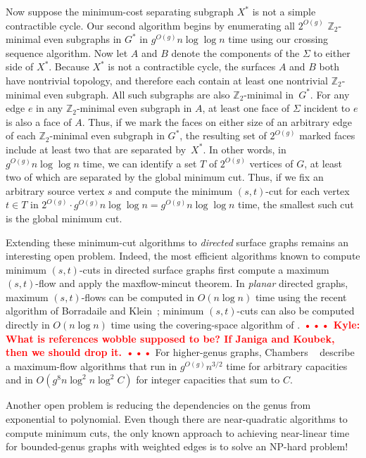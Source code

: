 \documentclass[natbib]{svcyclop}
\def\NOTE#1{\textcolor{Red}{\textbf{\textsf{••• #1 •••}}}}
\def\Z{\mathbb{Z}}
\begin{document}
Now suppose the minimum-cost separating subgraph $X^*$ is not a simple contractible cycle.  Our second algorithm begins by enumerating all $2^{O(g)}$ $\Z_2$-minimal even subgraphs in $G^*$ in $g^{O(g)}n\log\log n$ time using our crossing sequence algorithm.  Now let $A$ and $B$ denote the components of the $\Sigma$ to either side of $X^*$.  Because $X^*$ is not a contractible cycle, the surfaces $A$ and $B$ both have nontrivial topology, and therefore each contain at least one nontrivial $\Z_2$-minimal even subgraph.  All such subgraphs are also $\Z_2$-minimal in~$G^*$.  For any edge $e$ in any $\Z_2$-minimal even subgraph in $A$, at least one face of $\Sigma$ incident to $e$ is also a face of $A$.  Thus, if we mark the faces on either size of an arbitrary edge of each $\Z_2$-minimal even subgraph in $G^*$, the resulting set of $2^{O(g)}$ marked faces include at least two that are separated by~$X^*$.  In other words, in $g^{O(g)}n\log\log n$ time, we can identify a set $T$ of $2^{O(g)}$ vertices of $G$, at least two of which are separated by the global minimum cut.  Thus, if we fix an arbitrary source vertex $s$ and compute the minimum $(s,t)$-cut for each vertex $t\in T$ in $2^{O(g)}\cdot g^{O(g)}n\log\log n = g^{O(g)}n\log\log n$ time, the smallest such cut is the global minimum cut.




\OpenProb

Extending these minimum-cut algorithms to \emph{directed} surface graphs remains an interesting open problem.  Indeed, the most efficient algorithms known to compute minimum $(s,t)$-cuts in directed surface graphs first compute a maximum $(s,t)$-flow and apply the maxflow-mincut theorem.  In \emph{planar} directed graphs, maximum $(s,t)$-flows can be computed in $O(n\log n)$ time using the recent algorithm of Borradaile and Klein~\cite{bk-amfdp-09}; minimum $(s,t)$-cuts can also be computed directly in $O(n\log n)$ time using the covering-space algorithm of \cite{wobble}.
\NOTE{Kyle: What is references wobble supposed to be? If Janiga and Koubek, then we should drop it.}
For higher-genus graphs, Chambers \etal~\cite{cen-hfcc-12} describe a  maximum-flow algorithms that run in $g^{O(g)}n^{3/2}$ time for arbitrary capacities and in $O(g^8 n\log^2 n \log^2 C)$ for integer capacities that sum to $C$.

Another open problem is reducing the dependencies on the genus from exponential to polynomial.  Even though there are near-quadratic algorithms to compute minimum cuts, the only known approach to achieving near-linear time for bounded-genus graphs with weighted edges is to solve an NP-hard problem!
\end{document}
